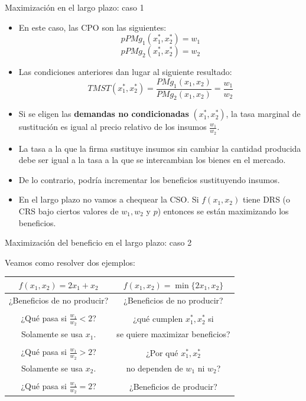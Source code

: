 \documentclass{beamer}
\theoremstyle{definition}
\begin{document}
	 \begin{frame}{Maximización en el largo plazo: caso 1}
  \small
	 \begin{itemize}
 	\item En este caso, las CPO son las siguientes:
 	\begin{equation*}
 	pPMg_{1}(x_{1}^*,x_{2}^*)=w_{1}
 	\end{equation*}
 	\begin{equation*}
 	pPMg_{2}(x_{1}^*,x_{2}^*)=w_{2}
 	\end{equation*}

	\item Las condiciones anteriores dan lugar al siguiente resultado:
	\begin{equation*}
	TMST(x_{1}^*,x_{2}^*)=\frac{PMg_{1}(x_{1},x_{2})}{	PMg_{2}(x_{1},x_{2})}=\frac{w_{1}}{w_{2}}
	\end{equation*}
	\item Si se eligen las \textbf{demandas no condicionadas} $(x_1^*, x_2^*)$, la tasa marginal de sustituci\'on es igual al precio relativo de los insumos $\frac{w_1}{w_2}$. 
 \item La tasa a la que la firma sustituye insumos sin cambiar la cantidad producida debe ser igual a la tasa a la que se intercambian los bienes en el mercado. 
	\item De lo contrario, podr\'ia incrementar los beneficios sustituyendo insumos.
 \item En el largo plazo no vamos a chequear la CSO. Si $f(x_1,x_2)$ tiene DRS (o CRS bajo ciertos valores de $w_1, w_2$ y $p$) entonces se están maximizando los beneficios.
\end{itemize}
\end{frame}		


\begin{frame}{Maximización del beneficio en el largo plazo: caso 2}

Veamos como resolver dos ejemplos:
\begin{center}
\begin{tabular}{c|c}
\hline
   $f(x_1,x_2)=2x_1+x_2$  &  $f(x_1,x_2)=\min \{2x_1,x_2\}$  \\
   \hline
   \color{gray} ¿Beneficios de no producir?     & \color{gray} ¿Beneficios de no producir?\\
     & \\
 \color{gray} ¿Qué pasa si $\frac{w_1}{w_2}<2$?    & \color{gray}  ¿qué cumplen $x_1^*, x_2^*$ si\\ 
\color{gray}Solamente se usa $x_1$.     & \color{gray} se quiere maximizar beneficios? \\
     & \\
  \color{gray} ¿Qué pasa si $\frac{w_1}{w_2}>2$?  & \color{gray} ¿Por qué $x_1^*, x_2^*$  \\
  \color{gray} Solamente se usa $x_2$.    &\color{gray}no dependen de $w_1$ ni $w_2$? \\
     & \\
 \color{gray} ¿Qué pasa si $\frac{w_1}{w_2}=2$?    &\color{gray} ¿Beneficios de producir? \\
\end{tabular}
   \end{center} 
   \end{frame}
\end{document}
